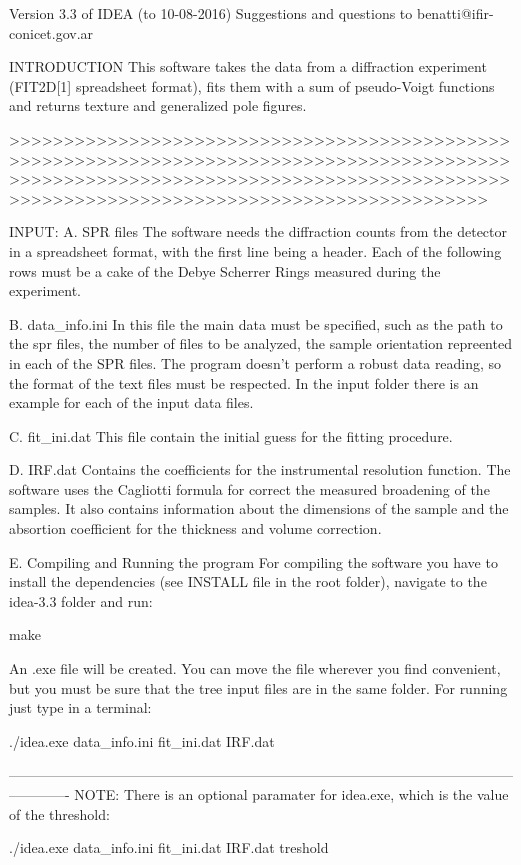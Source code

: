 Version 3.3 of IDEA (to 10-08-2016)
Suggestions and questions to benatti@ifir-conicet.gov.ar

INTRODUCTION
This software takes the data from a diffraction experiment (FIT2D[1] spreadsheet format), fits them with a sum of pseudo-Voigt functions and returns texture and generalized pole figures.

>>>>>>>>>>>>>>>>>>>>>>>>>>>>>>>>>>>>>>>>>>>>>>>>>>>>>>>>>>>>>>>>>>>>>>>>>>>>>>>>>>>>>>>>>>>>>>>>>>>>>>>>>>>>>>>>>>>>>>>>>>>>>>>>>>>>>>>>>>>>>>>>>>>>>>>>>>>>>>>>>>>>>>>>>>>>>>>>>>>>>>

INPUT:
A. SPR files
The software needs the diffraction counts from the detector in a spreadsheet format, with the first line being a header. Each of the following rows must be a cake of the Debye Scherrer Rings measured during the experiment.

B. data_info.ini
In this file the main data must be specified, such as the path to the spr files, the number of files to be analyzed, the sample orientation repreented in each of the SPR files. The program doesn't perform a robust data reading, so the format of the text files must be respected. In the input folder there is an example for each of the input data files.

C. fit_ini.dat
This file contain the initial guess for the fitting procedure.

D. IRF.dat
Contains the coefficients for the instrumental resolution function. The software uses the Cagliotti formula for correct the measured broadening of the samples. It also contains information about the dimensions of the sample and the absortion coefficient for the thickness and volume correction.

E. Compiling and Running the program
For compiling the software you have to install the dependencies (see INSTALL file in the root folder), navigate to the idea-3.3 folder and run:

make

An .exe file will be created. You can move the file wherever you find convenient, but you must be sure that the tree input files are in the same folder. For running just type in a terminal:

./idea.exe data_info.ini fit_ini.dat IRF.dat

-------------------------------------------------------------------------------------------------------------------------
NOTE: There is an optional paramater for idea.exe, which is the value of the threshold:

./idea.exe data_info.ini fit_ini.dat IRF.dat treshold

